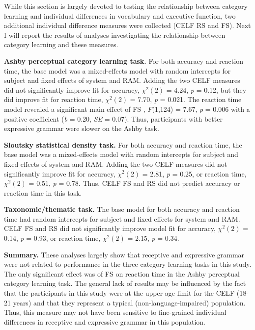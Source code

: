 \documentclass[../dissertation.tex]{subfiles}
\begin{document}
While this section is largely devoted to testing the relationship between category learning and individual differences in vocabulary and executive function, two additional individual difference measures were collected (CELF RS and FS). Next I will report the results of analyses investigating the relationship between category learning and these measures. \par
\textbf{Ashby perceptual category learning task.} For both accuracy and reaction time, the base model was a mixed-effects model with random intercepts for subject and fixed effects of system and RAM. Adding the two CELF measures did not significantly improve fit for accuracy, $\chi^{2}(2)$ = 4.24, \textit{p} = 0.12, but they did improve fit for reaction time, $\chi^{2}(2)$ = 7.70, \textit{p} = 0.021. The reaction time model revealed a significant main effect of FS , \textit{F}(1,124) = 7.67, \textit{p} = 0.006 with a positive coefficient (\textit{b} = 0.20, \textit{SE} = 0.07). Thus, participants with better expressive grammar were slower on the Ashby task. \par
\textbf{Sloutsky statistical density task.} For both accuracy and reaction time, the base model was a mixed-effects model with random intercepts for subject and fixed effects of system and RAM. Adding the two CELF measures did not significantly improve fit for accuracy, $\chi^{2}(2)$ = 2.81, \textit{p} = 0.25, or reaction time, $\chi^{2}(2)$ = 0.51, \textit{p} = 0.78. Thus, CELF FS and RS did not predict accuracy or reaction time in this task. \par
\textbf{Taxonomic/thematic task.} The base model for both accuracy and reaction time had random intercepts for subject and fixed effects for system and RAM. CELF FS and RS did not significantly improve model fit for accuracy, $\chi^{2}(2)$ = 0.14, \textit{p} = 0.93, or reaction time, $\chi^{2}(2)$ = 2.15, \textit{p} = 0.34. \par
\textbf{Summary.} These analyses largely show that receptive and expressive grammar were not related to performance in the three category learning tasks in this study. The only significant effect was of FS on reaction time in the Ashby perceptual category learning task. The general lack of results may be influenced by the fact that the participants in this study were at the upper age limit for the CELF (18-21 years) and that they represent a typical (non-language-impaired) population. Thus, this measure may not have been sensitive to fine-grained individual differences in receptive and expressive grammar in this population.
\end{document}
